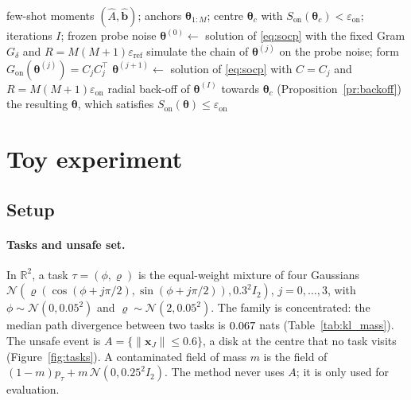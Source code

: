 \documentclass{article}
\newcommand{\RR}{\mathbb{R}}
\newcommand{\Gon}{G_{\mathrm{on}}}
\newcommand{\bth}{\boldsymbol{\theta}}
\newcommand{\bx}{\mathbf{x}}
\theoremstyle{plain}
\begin{document}
\begin{algorithm}[t]
\caption{Few-shot training with an on-policy order-$1$ constraint (sequential convex programming).}
\label{alg:scp}
\begin{algorithmic}[1]
\Require few-shot moments $(\hat A,\hat{\mathbf{b}})$; anchors $\bth_{1:M}$; centre $\bth_c$ with
$S_{\mathrm{on}}(\bth_c)<\varepsilon_{\mathrm{on}}$; iterations $I$; frozen probe noise
\State $\bth^{(0)}\gets$ solution of \eqref{eq:socp} with the fixed Gram $G_\delta$ and $R=M(M+1)\varepsilon_{\mathrm{ref}}$
  \State simulate the chain of $\bth^{(j)}$ on the probe noise; form $\Gon(\bth^{(j)})=C_jC_j^\top$
  \State $\bth^{(j+1)}\gets$ solution of \eqref{eq:socp} with $C=C_j$ and $R=M(M+1)\varepsilon_{\mathrm{on}}$
\EndFor
\If{$S_{\mathrm{on}}(\bth^{(I)})>\varepsilon_{\mathrm{on}}$} radial back-off of $\bth^{(I)}$ towards $\bth_c$
(Proposition~\ref{pr:backoff}) \EndIf
\State \Return the resulting $\bth$, which satisfies $S_{\mathrm{on}}(\bth)\leq\varepsilon_{\mathrm{on}}$
\end{algorithmic}
\end{algorithm}

\section{Toy experiment}\label{sec:experiments}

\subsection{Setup}\label{subsec:setup}

\paragraph{Tasks and unsafe set.}
In $\RR^2$, a task $\tau=(\phi,\varrho)$ is the equal-weight mixture of four Gaussians
$\mathcal{N}(\varrho(\cos(\phi+j\pi/2),\sin(\phi+j\pi/2)),0.3^2I_2)$, $j=0,\dots,3$, with
$\phi\sim\mathcal{N}(0,0.05^2)$ and $\varrho\sim\mathcal{N}(2,0.05^2)$. The family is concentrated: the median
path divergence between two tasks is $0.067$ nats (Table~\ref{tab:kl_mass}). The unsafe event is
$A=\{\|\bx_J\|\leq0.6\}$, a disk at the centre that no task visits
(Figure~\ref{fig:tasks}). A contaminated field of mass $m$ is the field of
$(1-m)p_\tau+m\,\mathcal{N}(0,0.25^2I_2)$. The method never uses $A$; it is only used for evaluation.
\end{document}
